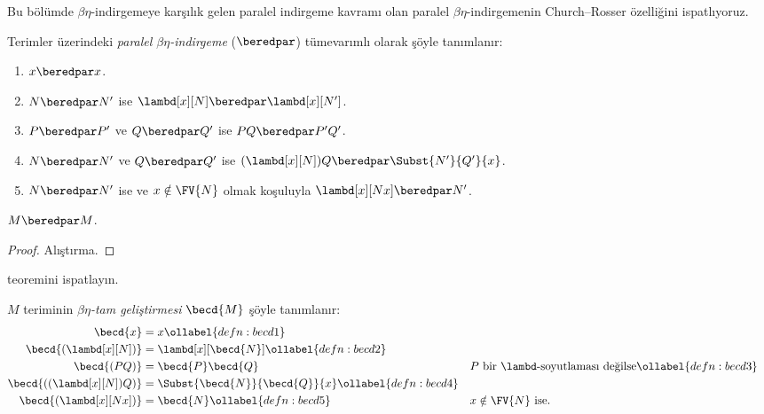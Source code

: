 



Bu bölümde $\beta\eta$-indirgemeye karşılık gelen paralel indirgeme kavramı
olan paralel $\beta\eta$-indirgemenin Church--Rosser özelliğini ispatlıyoruz.

\begin{defn}
  Terimler üzerindeki \emph{paralel $\beta\eta$-indirgeme} ($\beredpar$)
  tümevarımlı olarak şöyle tanımlanır:
  \begin{enumerate}
    \item {} $x \beredpar x$.
    \item {} $N \beredpar N'$ ise
      $\lambd[x][N] \beredpar \lambd[x][N']$.
    \item {} $P \beredpar P'$ ve $Q \beredpar Q'$ ise
      $PQ \beredpar P'Q'$.
    \item {} $N \beredpar N'$ ve $Q \beredpar Q'$ ise
      $(\lambd[x][N])Q \beredpar \Subst{N'}{Q'}{x}$.
    \item {} $N \beredpar N'$ ise ve
      $x \notin \FV{N}$ olmak koşuluyla
      $\lambd[x][Nx] \beredpar N'$.
  \end{enumerate}
\end{defn}

\begin{thm}
  $M \beredpar M$.
\end{thm}

\begin{proof}
  Alıştırma.
\end{proof}

\begin{prob}
   teoremini ispatlayın.
\end{prob}

\begin{defn}
  $M$ teriminin \emph{$\beta\eta$-tam geliştirmesi} $\becd{M}$ şöyle
  tanımlanır:
  \begin{align}
    \becd{x} &= x \ollabel{defn:becd1} \\
    \becd{(\lambd[x][N])} &= \lambd[x][\becd{N}] \ollabel{defn:becd2}\\
    \becd{(PQ)} &= \becd{P}\becd{Q} && \text{$P$ bir $\lambd$-soyutlaması değilse}
    \ollabel{defn:becd3} \\
    \becd{((\lambd[x][N])Q)} &= \Subst{\becd{N}}{\becd{Q}}{x}
                             \ollabel{defn:becd4} \\
    \becd{(\lambd[x][Nx])} &= \becd{N} \ollabel{defn:becd5} &&
                             \text{$x\notin\FV{N}$ ise.}
  \end{align}
\end{defn}

